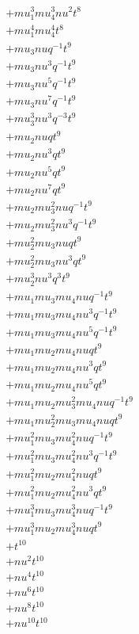 \begin{align*}
  + mu_1^{3} mu_4^{3} nu^{2} t^{8} \\
  + mu_1^{4} mu_4^{4} t^{8} \\
  + mu_3 nu q^{-1} t^{9} \\
  + mu_3 nu^{3} q^{-1} t^{9} \\
  + mu_3 nu^{5} q^{-1} t^{9} \\
  + mu_3 nu^{7} q^{-1} t^{9} \\
  + mu_3^{3} nu^{3} q^{-3} t^{9} \\
  + mu_2 nu q t^{9} \\
  + mu_2 nu^{3} q t^{9} \\
  + mu_2 nu^{5} q t^{9} \\
  + mu_2 nu^{7} q t^{9} \\
  + mu_2 mu_3^{2} nu q^{-1} t^{9} \\
  + mu_2 mu_3^{2} nu^{3} q^{-1} t^{9} \\
  + mu_2^{2} mu_3 nu q t^{9} \\
  + mu_2^{2} mu_3 nu^{3} q t^{9} \\
  + mu_2^{3} nu^{3} q^{3} t^{9} \\
  + mu_1 mu_3 mu_4 nu q^{-1} t^{9} \\
  + mu_1 mu_3 mu_4 nu^{3} q^{-1} t^{9} \\
  + mu_1 mu_3 mu_4 nu^{5} q^{-1} t^{9} \\
  + mu_1 mu_2 mu_4 nu q t^{9} \\
  + mu_1 mu_2 mu_4 nu^{3} q t^{9} \\
  + mu_1 mu_2 mu_4 nu^{5} q t^{9} \\
  + mu_1 mu_2 mu_3^{2} mu_4 nu q^{-1} t^{9} \\
  + mu_1 mu_2^{2} mu_3 mu_4 nu q t^{9} \\
  + mu_1^{2} mu_3 mu_4^{2} nu q^{-1} t^{9} \\
  + mu_1^{2} mu_3 mu_4^{2} nu^{3} q^{-1} t^{9} \\
  + mu_1^{2} mu_2 mu_4^{2} nu q t^{9} \\
  + mu_1^{2} mu_2 mu_4^{2} nu^{3} q t^{9} \\
  + mu_1^{3} mu_3 mu_4^{3} nu q^{-1} t^{9} \\
  + mu_1^{3} mu_2 mu_4^{3} nu q t^{9} \\
  + t^{10} \\
  + nu^{2} t^{10} \\
  + nu^{4} t^{10} \\
  + nu^{6} t^{10} \\
  + nu^{8} t^{10} \\
  + nu^{10} t^{10} \\

\end{align*}
